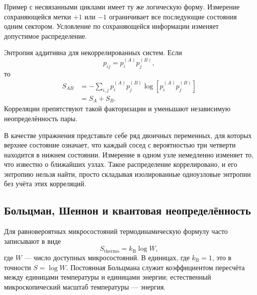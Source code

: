 Пример с несвязанными циклами имеет ту же логическую форму. Измерение сохраняющейся метки \(+1\) или \(-1\) ограничивает все последующие состояния одним сектором. Условление по сохраняющейся информации изменяет допустимое распределение.

Энтропия аддитивна для некоррелированных систем. Если
\begin{equation}
 p_{ij}=p_i^{(A)}p_j^{(B)},
\end{equation}
то
\begin{align}
 S_{AB}
 &=-\sum_{i,j}p_i^{(A)}p_j^{(B)}
 \log\!\left[p_i^{(A)}p_j^{(B)}\right]\\
 &=S_A+S_B.
 \label{eq:sm1-entropy-additivity}
\end{align}
Корреляции препятствуют такой факторизации и уменьшают независимую неопределённость пары.

В качестве упражнения представьте себе ряд двоичных переменных, для которых верхнее состояние означает, что каждый сосед с вероятностью три четверти находится в нижнем состоянии. Измерение в одном узле немедленно изменяет то, что известно о ближайших узлах. Такое распределение коррелировано, и его энтропию нельзя найти, просто складывая изолированные одноузловые энтропии без учёта этих корреляций.

\subsection{Больцман, Шеннон и квантовая неопределённость}

\begin{classroomqa}
\end{classroomqa}

Для равновероятных микросостояний термодинамическую формулу часто записывают в виде
\begin{equation}
 S_{\mathrm{thermo}}=k_{\mathrm B}\log W,
 \label{eq:sm1-boltzmann-formula}
\end{equation}
где \(W\) — число доступных микросостояний. В единицах, где \(k_{\mathrm B}=1\), это в точности \(S=\log W\). Постоянная Больцмана служит коэффициентом пересчёта между единицами температуры и единицами энергии; естественный микроскопический масштаб температуры — энергия.

